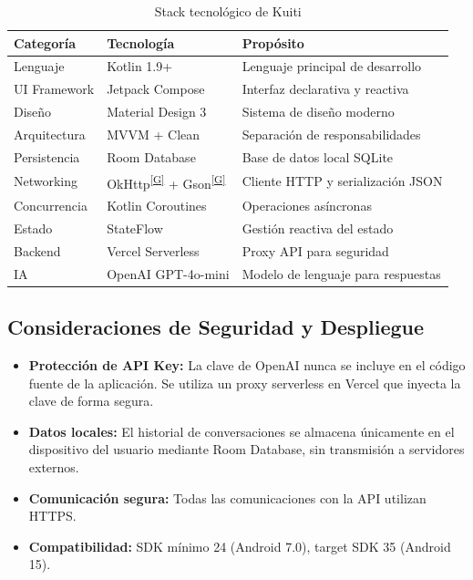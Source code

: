 \documentclass[12pt,a4paper]{report}
\numberwithin{figure}{section}
\begin{document}
\begin{table}[h!]
\centering
\caption{Stack tecnológico de Kuiti}
\label{tab:stack_tecnologico}
\renewcommand{\arraystretch}{1.3}
\begin{tabular}{@{}p{3.5cm}p{3.5cm}p{7cm}@{}}
\toprule
\textbf{Categoría} & \textbf{Tecnología} & \textbf{Propósito} \\
\midrule
Lenguaje & Kotlin 1.9+ & Lenguaje principal de desarrollo \\
\midrule
UI Framework & Jetpack Compose & Interfaz declarativa y reactiva \\
\midrule
Diseño & Material Design 3 & Sistema de diseño moderno \\
\midrule
Arquitectura & MVVM + Clean & Separación de responsabilidades \\
\midrule
Persistencia & Room Database & Base de datos local SQLite \\
\midrule
Networking & OkHttp\textsuperscript{\hyperref[glos:okhttp]{[G]}} + Gson\textsuperscript{\hyperref[glos:gson]{[G]}} & Cliente HTTP y serialización JSON \\
\midrule
Concurrencia & Kotlin Coroutines & Operaciones asíncronas \\
\midrule
Estado & StateFlow & Gestión reactiva del estado \\
\midrule
Backend & Vercel Serverless & Proxy API para seguridad \\
\midrule
IA & OpenAI GPT-4o-mini & Modelo de lenguaje para respuestas \\
\bottomrule
\end{tabular}
\end{table}

\vspace{1em}
\subsection{Consideraciones de Seguridad y Despliegue}
\label{subsec:seguridad_despliegue}

\begin{itemize}
  \item \textbf{Protección de API Key:} La clave de OpenAI nunca se incluye en el código fuente de la aplicación. Se utiliza un proxy serverless en Vercel que inyecta la clave de forma segura.
  \item \textbf{Datos locales:} El historial de conversaciones se almacena únicamente en el dispositivo del usuario mediante Room Database, sin transmisión a servidores externos.
  \item \textbf{Comunicación segura:} Todas las comunicaciones con la API utilizan HTTPS.
  \item \textbf{Compatibilidad:} SDK mínimo 24 (Android 7.0), target SDK 35 (Android 15).
\end{itemize}
\end{document}
